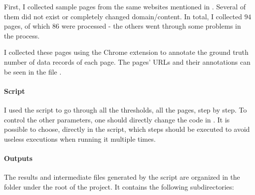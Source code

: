 \documentclass[10pt]{article}
\begin{document}
First, I collected sample pages from the same websites mentioned in \cite{mdr}\footnotemark. Several of them did not exist or completely changed domain/content. In total, I collected $94$ pages, of which $86$ were processed - the others went through some problems in the process. 


I collected these pages using the Chrome extension to annotate the ground truth number of data records of each page. The pages' URLs and their annotations can be seen in the file \footnotemark.


\paragraph{Script}

I used the script \footnotemark to go through all the thresholds, all the pages, step by step. To control the other parameters, one should directly change the code in . It is possible to choose, directly in the script, which steps should be executed to avoid useless executions when running it multiple times.

    


\paragraph{Outputs}

The results and intermediate files generated by the script are organized in the folder  under the root of the project. It contains the following subdirectories: 
\end{document}
